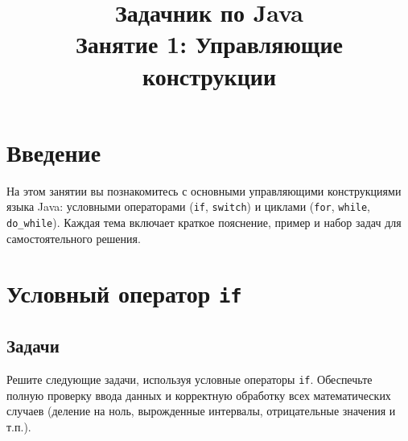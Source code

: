 \documentclass[12pt]{article}
\title{Задачник по Java \\ Занятие 1: Управляющие конструкции}
\author{}
\date{}
\begin{document}
\maketitle

\section*{Введение}
На этом занятии вы познакомитесь с основными управляющими конструкциями языка Java: условными операторами (\texttt{if}, \texttt{switch}) и циклами (\texttt{for}, \texttt{while}, \texttt{do\_while}). Каждая тема включает краткое пояснение, пример и набор задач для самостоятельного решения.


\section{Условный оператор \texttt{if}}

\subsection*{Задачи}

Решите следующие задачи, используя условные операторы \texttt{if}. Обеспечьте полную проверку ввода данных и корректную обработку всех математических случаев (деление на ноль, вырожденные интервалы, отрицательные значения и т.п.).
\end{document}

